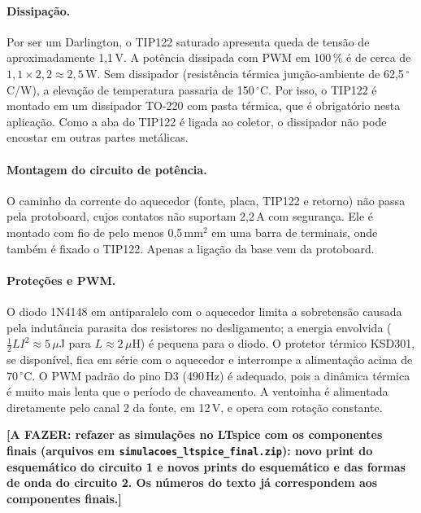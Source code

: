 \paragraph{Dissipação.} Por ser um Darlington, o TIP122 saturado apresenta queda de tensão de aproximadamente 1,1\,V. A potência dissipada com PWM em 100\,\% é de cerca de $1{,}1 \times 2{,}2 \approx 2{,}5$\,W. Sem dissipador (resistência térmica junção-ambiente de 62,5\,\ensuremath{^\circ}C/W), a elevação de temperatura passaria de 150\,\ensuremath{^\circ}C. Por isso, o TIP122 é montado em um dissipador TO-220 com pasta térmica, que é obrigatório nesta aplicação. Como a aba do TIP122 é ligada ao coletor, o dissipador não pode encostar em outras partes metálicas.

\paragraph{Montagem do circuito de potência.} O caminho da corrente do aquecedor (fonte, placa, TIP122 e retorno) não passa pela protoboard, cujos contatos não suportam 2,2\,A com segurança. Ele é montado com fio de pelo menos 0,5\,mm$^2$ em uma barra de terminais, onde também é fixado o TIP122. Apenas a ligação da base vem da protoboard.

\paragraph{Proteções e PWM.} O diodo 1N4148 em antiparalelo com o aquecedor limita a sobretensão causada pela indutância parasita dos resistores no desligamento; a energia envolvida ($\tfrac{1}{2} L I^2 \approx 5\,\mu$J para $L \approx 2\,\mu$H) é pequena para o diodo. O protetor térmico KSD301, se disponível, fica em série com o aquecedor e interrompe a alimentação acima de 70\,\ensuremath{^\circ}C. O PWM padrão do pino D3 (490\,Hz) é adequado, pois a dinâmica térmica é muito mais lenta que o período de chaveamento. A ventoinha é alimentada diretamente pelo canal 2 da fonte, em 12\,V, e opera com rotação constante.

{\color{red}\noindent\textbf{[A FAZER: refazer as simulações no LTspice com os componentes finais (arquivos em \texttt{simulacoes\_ltspice\_final.zip}): novo print do esquemático do circuito 1 e novos prints do esquemático e das formas de onda do circuito 2. Os números do texto já correspondem aos componentes finais.]}}
